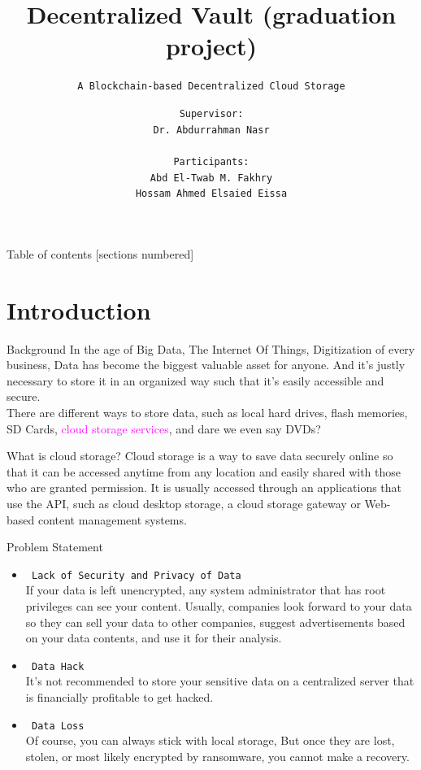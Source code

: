 \documentclass[aspectratio=169,usenames,dvipsnames,pdftex]{beamer}
\title{Decentralized Vault (graduation project)}
\subtitle{\texttt{A Blockchain-based Decentralized Cloud Storage}}
\date {}
\author {
  \texttt{Supervisor:} \\
  \texttt{\large{Dr. Abdurrahman Nasr}} \\
  \\
  \texttt{Participants:} \\
  \texttt{\large{Abd El-Twab M. Fakhry}} \\
  \texttt{\large{Hossam Ahmed Elsaied Eissa}}
}
\institute {
  \centering
  Al-Azhar University \\
  Faculty of Engineering \\
  Computers \& Systems Engineering Department \\\vspace{8pt}
  \today
}
\begin{document}
	\maketitle

	\begin{frame}{Table of contents}
		[sections numbered]
		\tableofcontents[hideallsubsections]
	\end{frame}

  \section{{Introduction}}

  \begin{frame}[t]{Background}\vspace{8pt}
    In the age of Big Data, The Internet Of Things, Digitization of every business, Data has become the biggest valuable asset for anyone.
    And it’s justly necessary to store it in an organized way such that it’s easily accessible and secure. \\[4pt]
    There are different ways to store data, such as local hard drives, flash memories, SD Cards, \textcolor{magenta}{\faCloud{}  cloud storage services}, and dare we even say DVDs? \\[10pt]

    \begin{block}{What is \faCloud{} cloud storage?}
      Cloud storage is a way to save data securely online so that it can be accessed anytime from any location and easily shared with those who are granted permission.
      It is usually accessed through an applications that use the API, such as cloud desktop storage, a cloud storage gateway or Web-based content management systems.
    \end{block}

  \end{frame}

  \begin{frame}[t]{Problem Statement}%
    \begin{itemize}
    \item \texttt{\textcolor{red}{\faTimesCircle} Lack of Security and Privacy of Data} \\
      If your data is left unencrypted, any system administrator that has root privileges can see your content.
      Usually, companies look forward to your data so they can sell your data to other companies, suggest advertisements based on your data contents, and use it for their analysis.
    \item \texttt{\textcolor{red}{\faTimesCircle} Data Hack} \\
      It's not recommended to store your sensitive data on a centralized server that is financially profitable to get hacked.
    \item \texttt{\textcolor{red}{\faTimesCircle} Data Loss} \\
      Of course, you can always stick with local storage, But once they are lost, stolen, or most likely encrypted by ransomware, you cannot make a recovery.
    \end{itemize}
  \end{frame}
\end{document}
